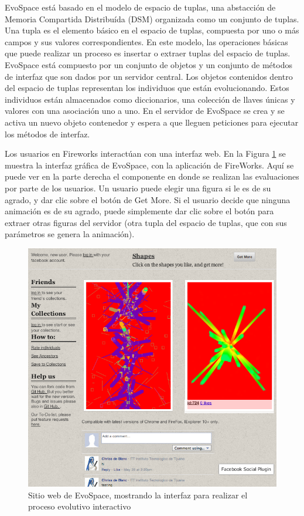EvoSpace está basado en el modelo de espacio de tuplas, una abstacción
de Memoria Compartida Distribuída (DSM) organizada como un conjunto de
tuplas. Una tupla es el elemento básico en el espacio de tuplas,
compuesta por uno o más campos y sus valores correspondientes. En este
modelo, las operaciones básicas que puede realizar un proceso es
insertar o extraer tuplas del espacio de tuplas. EvoSpace está
compuesto por un conjunto de objetos y un conjunto de métodos de
interfaz que son dados por un servidor central. Los objetos contenidos
dentro del espacio de tuplas representan los individuos que están
evolucionando. Estos individuos están almacenados como diccionarios,
una colección de llaves únicas y valores con una asociación uno a
uno. En el servidor de EvoSpace se crea y se activa un nuevo objeto
contenedor y espera a que lleguen peticiones para ejecutar los métodos
de interfaz.

Los usuarios en Fireworks interactúan con una interfaz web. En la
Figura \ref{EvoSpace} se muestra la interfaz gráfica de EvoSpace, con
la aplicación de FireWorks. Aquí se puede ver en la parte derecha el
componente en donde se realizan las evaluaciones por parte de los
usuarios. Un usuario puede elegir una figura si le es de su agrado, y
dar clic sobre el botón de Get More. Si el usuario decide que ninguna
animación es de su agrado, puede simplemente dar clic sobre el botón
para extraer otras figuras del servidor (otra tupla del espacio de
tuplas, que con sus parámetros se genera la animación).

\clearpage

\begin{figure}[htp]
  \centerline{\includegraphics[width=16.09cm]{fireworks.png}} \caption{
    Sitio web de EvoSpace, mostrando la interfaz para realizar el proceso evolutivo interactivo
} \label{EvoSpace}
\end{figure}

